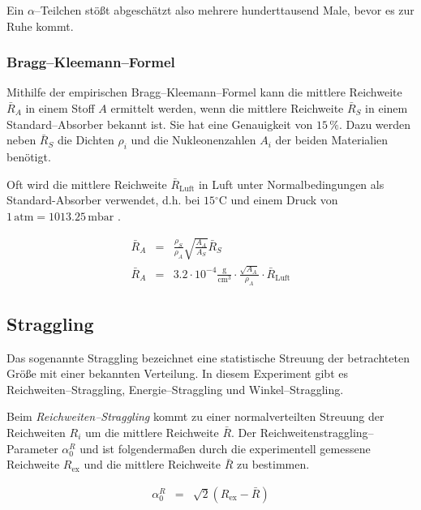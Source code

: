 \documentclass[12pt,a4paper]{scrartcl}
\numberwithin{equation}{section} %
\begin{document}
\noindent
Ein $\alpha$--Teilchen stößt abgeschätzt also mehrere hunderttausend Male, bevor es zur Ruhe kommt.

\hypertarget{bragg-kleemann-formel}{%
\subsubsection{Bragg--Kleemann--Formel}\label{bragg-kleemann-formel}}

Mithilfe der empirischen Bragg--Kleemann--Formel kann die mittlere Reichweite $\bar R_A$ in einem Stoff $A$ ermittelt werden, wenn die mittlere Reichweite $\bar R_S$ in einem Standard--Absorber bekannt ist. Sie hat eine Genauigkeit von $15\,\%$. Dazu werden neben $\bar R_S$ die Dichten $\rho_i$ und die Nukleonenzahlen $A_i$ der beiden Materialien benötigt.

Oft wird die mittlere Reichweite $\bar R_\mathrm{Luft}$ in Luft unter Normalbedingungen als Standard-Absorber verwendet, d.h. bei $15\mathrm{^\circ C}$ und einem Druck von $1\mathrm{\,atm}=1013.25\mathrm{\,mbar}$ \cite{DWD}.

\begin{eqnarray}
    \bar R_A &=& \frac{\rho_S}{\rho_A}
        \sqrt{\frac{A_A}{A_S}} \bar R_S \\
    \bar R_A &=& 3.2\cdot 10^{-4} \mathrm{\frac{g}{cm^3}}
        \cdot\frac{\sqrt{A_A}}{\rho_A}\cdot \bar R_\mathrm{Luft}
\end{eqnarray}

\hypertarget{straggling}{%
\subsection{Straggling}\label{straggling}}

Das sogenannte Straggling bezeichnet eine statistische Streuung der betrachteten Größe mit einer bekannten Verteilung. In diesem Experiment gibt es Reichweiten--Straggling, Energie--Straggling und Winkel--Straggling.

Beim \emph{Reichweiten--Straggling} kommt zu einer normalverteilten Streuung der Reichweiten $R_i$ um die mittlere Reichweite $\bar{R}$. Der Reichweitenstraggling--Parameter $\alpha^R_0$ und ist folgendermaßen durch die experimentell gemessene Reichweite
$R_\mathrm{ex}$ und die mittlere Reichweite $\bar{R}$ zu bestimmen.

\begin{eqnarray}
    \alpha^R_0 &=& \sqrt{2}\left(R_\mathrm{ex}-\bar{R}\right)
\end{eqnarray}
\end{document}
